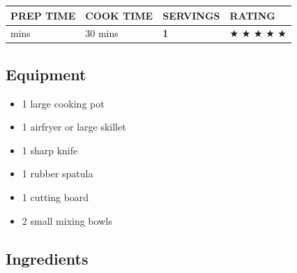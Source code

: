 \documentclass[
]{book}
\providecommand{\tightlist}{%
  \setlength{\itemsep}{0pt}\setlength{\parskip}{0pt}}
\begin{document}
\begin{longtable}[]{@{}llll@{}}
\toprule\noalign{}
\textbf{PREP TIME} & \textbf{COOK TIME} & \textbf{SERVINGS} &
\textbf{RATING} \\
\midrule\noalign{}
\endhead
\bottomrule\noalign{}
\endlastfoot
10 mins & 30 mins & \textbf{1} & ★ ★ ★ ★ ★ \\
\end{longtable}

\subsection*{Equipment}\label{equipment-2}

\begin{itemize}
\tightlist
\item
  1 large cooking pot
\item
  1 airfryer or large skillet
\item
  1 sharp knife
\item
  1 rubber spatula
\item
  1 cutting board
\item
  2 small mixing bowls
\end{itemize}

\subsection*{Ingredients}\label{ingredients-2}
\end{document}
